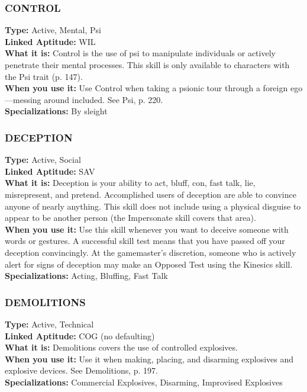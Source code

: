 \subsubsection{CONTROL} \textbf{Type:} Active, Mental, Psi \\ \textbf{Linked Aptitude:} WIL \\ \textbf{What it is:} Control is the use of psi to manipulate individuals or actively penetrate their mental processes. This skill is only available to characters with the Psi trait (p. 147). \\ \textbf{When you use it:} Use Control when taking a psionic tour through a foreign ego—messing around included. See Psi, p. 220. \\ \textbf{Specializations:} By sleight 

\subsubsection{DECEPTION} \textbf{Type:} Active, Social \\ \textbf{Linked Aptitude:} SAV \\ \textbf{What it is:} Deception is your ability to act, bluff, con, fast talk, lie, misrepresent, and pretend. Accomplished users of deception are able to convince anyone of nearly anything. This skill does not include using a physical disguise to appear to be another person (the Impersonate skill covers that area). \\ \textbf{When you use it:} Use this skill whenever you want to deceive someone with words or gestures. A successful skill test means that you have passed off your deception convincingly. At the gamemaster’s discretion, someone who is actively alert for signs of deception may make an Opposed Test using the Kinesics skill. \\ \textbf{Specializations:} Acting, Bluffing, Fast Talk 

\subsubsection{DEMOLITIONS} \textbf{Type:} Active, Technical \\ \textbf{Linked Aptitude:} COG (no defaulting) \\ \textbf{What it is:} Demolitions covers the use of controlled explosives. \\ \textbf{When you use it:} Use it when making, placing, and disarming explosives and explosive devices. See Demolitions, p. 197. \\ \textbf{Specializations:} Commercial Explosives, Disarming, Improvised Explosives 

